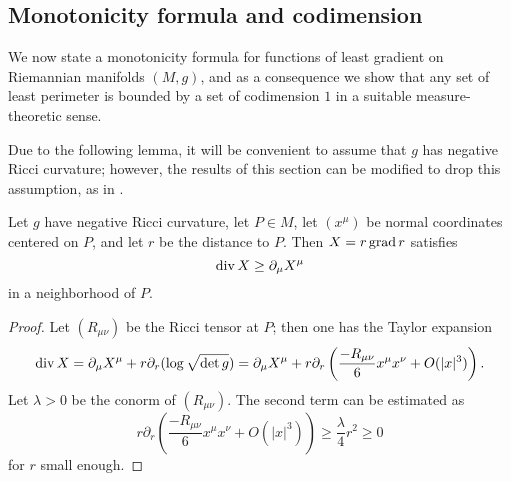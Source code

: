
\subsection{Monotonicity formula and codimension}
We now state a monotonicity formula for functions of least gradient on Riemannian manifolds $(M, g)$, and as a consequence we show that any set of least perimeter is bounded by a set of codimension $1$ in a suitable measure-theoretic sense.

Due to the following lemma, it will be convenient to assume that $g$ has negative Ricci curvature; however, the results of this section can be modified to drop this assumption, as in \cite[Theorem 7.11]{MarquesXX}.

\begin{lemma}\label{divergence estimate}
Let $g$ have negative Ricci curvature, let $P \in M$, let $(x^\mu)$ be normal coordinates centered on $P$, and let $r$ be the distance to $P$. Then $X = r\operatorname{grad} r$ satisfies
$$\operatorname{div} X \geq \partial_\mu X^\mu$$
in a neighborhood of $P$.
\end{lemma}
\begin{proof}
Let $(R_{\mu\nu})$ be the Ricci tensor at $P$; then one has the Taylor expansion \cite[Lemma 3.4]{schoen1994lectures}
$$\operatorname{div} X = \partial_\mu X^\mu + r\partial_r(\log \sqrt{\det g}) = \partial_\mu X^\mu + r\partial_r\left(\frac{-R_{\mu\nu}}{6}x^\mu x^\nu + O(|x|^3)\right).$$
Let $\lambda > 0$ be the conorm of $(R_{\mu\nu})$. The second term can be estimated as 
$$r\partial_r\left(\frac{-R_{\mu\nu}}{6}x^\mu x^\nu + O(|x|^3)\right) \geq \frac{\lambda}{4}r^2 \geq 0$$
for $r$ small enough.
\end{proof}

